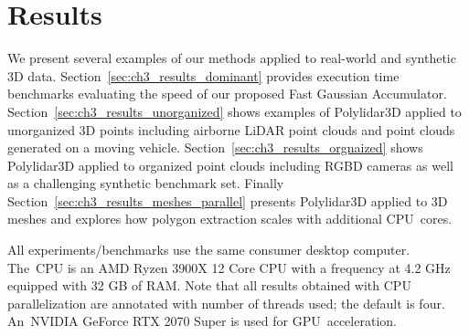     







\section{Results}\label{sec:ch3_results}

We present several examples of our methods applied to real-world and synthetic 3D data. Section~\ref{sec:ch3_results_dominant} provides execution time benchmarks evaluating the speed of our proposed Fast Gaussian Accumulator. Section~\ref{sec:ch3_results_unorganized} shows examples of Polylidar3D applied to unorganized 3D points including airborne LiDAR point clouds and point clouds generated on a moving vehicle.  Section~\ref{sec:ch3_results_orgnaized} shows Polylidar3D applied to organized point clouds including RGBD cameras as well as a challenging synthetic benchmark set. Finally Section~\ref{sec:ch3_results_meshes_parallel} presents Polylidar3D applied to 3D meshes and explores how polygon extraction scales with additional CPU~cores. 

All experiments/benchmarks use the same consumer desktop computer. The~CPU is an AMD Ryzen 3900X 12 Core CPU with a frequency at 4.2 GHz equipped with 32 GB of RAM.  Note that all results obtained with CPU parallelization are annotated with number of threads used; the default is four. An~NVIDIA GeForce RTX 2070 Super is used for GPU~acceleration.


